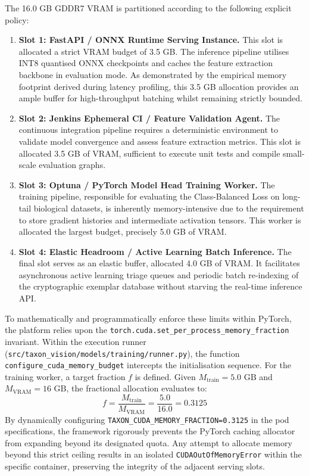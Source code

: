 The 16.0 GB GDDR7 VRAM is partitioned according to the following explicit policy:

\begin{enumerate}
    \item \textbf{Slot 1: FastAPI / ONNX Runtime Serving Instance.} This slot is allocated a strict VRAM budget of 3.5 GB. The inference pipeline utilises INT8 quantised ONNX checkpoints and caches the feature extraction backbone in evaluation mode. As demonstrated by the empirical memory footprint derived during latency profiling, this 3.5 GB allocation provides an ample buffer for high-throughput batching whilst remaining strictly bounded.
    \item \textbf{Slot 2: Jenkins Ephemeral CI / Feature Validation Agent.} The continuous integration pipeline requires a deterministic environment to validate model convergence and assess feature extraction metrics. This slot is allocated 3.5 GB of VRAM, sufficient to execute unit tests and compile small-scale evaluation graphs.
    \item \textbf{Slot 3: Optuna / PyTorch Model Head Training Worker.} The training pipeline, responsible for evaluating the Class-Balanced Loss on long-tail biological datasets, is inherently memory-intensive due to the requirement to store gradient histories and intermediate activation tensors. This worker is allocated the largest budget, precisely 5.0 GB of VRAM.
    \item \textbf{Slot 4: Elastic Headroom / Active Learning Batch Inference.} The final slot serves as an elastic buffer, allocated 4.0 GB of VRAM. It facilitates asynchronous active learning triage queues and periodic batch re-indexing of the cryptographic exemplar database without starving the real-time inference API.
\end{enumerate}

To mathematically and programmatically enforce these limits within PyTorch, the platform relies upon the \texttt{torch.cuda.set\_per\_process\_memory\_fraction} invariant. Within the execution runner\\(\texttt{src/taxon\_vision/models/training/runner.py}), the function\\\texttt{configure\_cuda\_memory\_budget} intercepts the initialisation sequence. For the training worker, a target fraction $f$ is defined. Given $M_{\text{train}} = 5.0\text{ GB}$ and $M_{\text{VRAM}} = 16\text{ GB}$, the fractional allocation evaluates to:
\[
f = \frac{M_{\text{train}}}{M_{\text{VRAM}}} = \frac{5.0}{16.0} = 0.3125
\]
By dynamically configuring \texttt{TAXON\_CUDA\_MEMORY\_FRACTION=0.3125} in the pod specifications, the framework rigorously prevents the PyTorch caching allocator from expanding beyond its designated quota. Any attempt to allocate memory beyond this strict ceiling results in an isolated \texttt{CUDAOutOfMemoryError} within the specific container, preserving the integrity of the adjacent serving slots.

